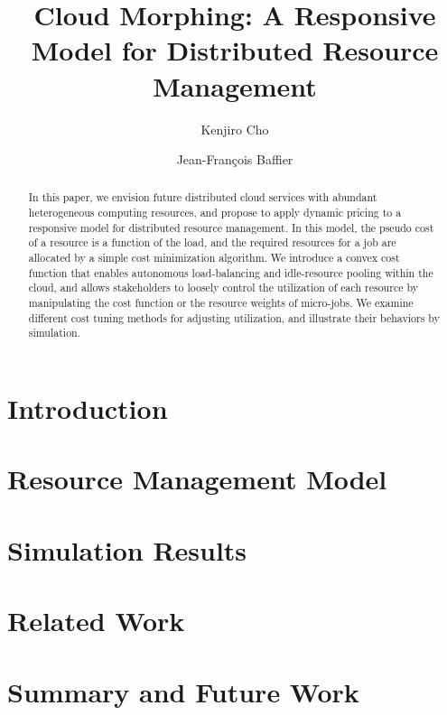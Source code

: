 \documentclass[10pt,sigconf,letterpaper,nonacm]{acmart}
\title{Cloud Morphing: A Responsive Model for Distributed Resource Management}
\author{Kenjiro Cho}
\affiliation{\institution{IIJ Research Laboratory}\city{}\country{}}
\author{Jean-François Baffier}
\affiliation{\institution{IIJ Research Laboratory}\city{}\country{}}
\begin{document}
\begin{abstract}

    In this paper, we envision future distributed cloud services with
    abundant heterogeneous computing resources,
    and propose to apply dynamic pricing to a responsive model for
    distributed resource management.
    In this model, the pseudo cost of a resource is a function of the
    load, and the required resources for a job are allocated by a simple
    cost minimization algorithm.
    We introduce a convex cost function that enables autonomous
    load-balancing and idle-resource pooling within the cloud, and allows
    stakeholders to loosely control the utilization of each resource by
    manipulating the cost function or the resource weights of micro-jobs.
    We examine different cost tuning methods for adjusting
    utilization, and illustrate their behaviors by simulation.

\end{abstract}

\maketitle

\section{Introduction}



\section{Resource Management Model}



\section{Simulation Results}



\section{Related Work}



\section{Summary and Future Work}





\end{document}
